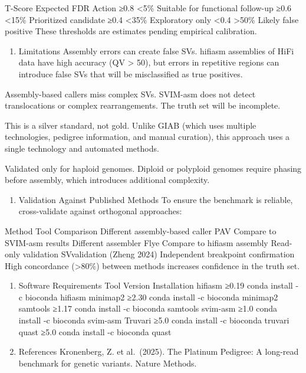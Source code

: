 \documentclass[
]{article}
\providecommand{\tightlist}{%
  \setlength{\itemsep}{0pt}\setlength{\parskip}{0pt}}
\begin{document}
T-Score Expected FDR Action ≥0.8 \textless5\% Suitable for functional
follow-up ≥0.6 \textless15\% Prioritized candidate ≥0.4 \textless35\%
Exploratory only \textless0.4 \textgreater50\% Likely false positive
These thresholds are estimates pending empirical calibration.

\begin{enumerate}
\def\labelenumi{\arabic{enumi}.}
\setcounter{enumi}{4}
\tightlist
\item
  Limitations Assembly errors can create false SVs. hifiasm assemblies
  of HiFi data have high accuracy (QV \textgreater{} 50), but errors in
  repetitive regions can introduce false SVs that will be misclassified
  as true positives.
\end{enumerate}

Assembly-based callers miss complex SVs. SVIM-asm does not detect
translocations or complex rearrangements. The truth set will be
incomplete.

This is a silver standard, not gold. Unlike GIAB (which uses multiple
technologies, pedigree information, and manual curation), this approach
uses a single technology and automated methods.

Validated only for haploid genomes. Diploid or polyploid genomes require
phasing before assembly, which introduces additional complexity.

\begin{enumerate}
\def\labelenumi{\arabic{enumi}.}
\setcounter{enumi}{5}
\tightlist
\item
  Validation Against Published Methods To ensure the benchmark is
  reliable, cross-validate against orthogonal approaches:
\end{enumerate}

Method Tool Comparison Different assembly-based caller PAV Compare to
SVIM-asm results Different assembler Flye Compare to hifiasm assembly
Read-only validation SVvalidation (Zheng 2024) Independent breakpoint
confirmation High concordance (\textgreater80\%) between methods
increases confidence in the truth set.

\begin{enumerate}
\def\labelenumi{\arabic{enumi}.}
\setcounter{enumi}{6}
\tightlist
\item
  Software Requirements Tool Version Installation hifiasm ≥0.19 conda
  install -c bioconda hifiasm minimap2 ≥2.30 conda install -c bioconda
  minimap2 samtools ≥1.17 conda install -c bioconda samtools svim-asm
  ≥1.0 conda install -c bioconda svim-asm Truvari ≥5.0 conda install -c
  bioconda truvari quast ≥5.0 conda install -c bioconda quast
\item
  References Kronenberg, Z. et al.~(2025). The Platinum Pedigree: A
  long-read benchmark for genetic variants. Nature Methods.
\end{enumerate}
\end{document}
